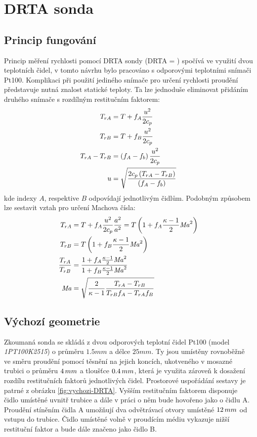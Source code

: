 \section{DRTA sonda}
    \subsection{Princip fungování} \label{sec:DRTA-princip}
        Princip měření rychlosti pomocí DRTA sondy (DRTA = ) spočívá ve využití dvou teplotních čidel, v tomto návrhu bylo pracováno s odporovými teplotními snímači Pt100. Komplikaci při použití jediného snímače pro určení rychlosti proudění představuje nutná znalost statické teploty. Ta lze jednoduše eliminovat přidáním druhého snímače s rozdílným restitučním faktorem:
        \begin{align}
            T_{rA} &= T + f_A \frac{u^2}{2 c_p} \\
            T_{rB} &= T + f_B \frac{u^2}{2 c_p} \\
            T_{rA} - T_{rB} &= \left( f_A - f_b \right) \frac{u^2}{2 c_p} \\
            u &= \sqrt{\frac{2 c_p \left( T_{rA} - T_{rB} \right)}{\left( f_A - f_b \right)}} \label{eq:mereni-rychlosti}             
        \end{align}
        \noindent kde indexy $A$, respektive $B$ odpovídají jednotlivým čidlům. Podobným způsobem lze sestavit vztah pro určení Machova čísla:
        \begin{align}
            T_{rA} &= T + f_A \frac{u^2}{2 c_p} \frac{a^2}{a^2} = T \left( 1 + f_A \frac{\kappa - 1}{2} \mathord{\mathit{Ma}} ^2 \right) \\
            T_{rB} &=  T \left( 1 + f_B \frac{\kappa - 1}{2} \mathord{\mathit{Ma}} ^2 \right) \\
            \frac{T_{rA}}{T_{rB}} &= \frac{1 + f_A \frac{\kappa - 1}{2} \mathord{\mathit{Ma}} ^2}{1 + f_B \frac{\kappa - 1}{2} \mathord{\mathit{Ma}} ^2} \\
            \mathord{\mathit{Ma}} &= \sqrt{\frac{2}{\kappa - 1} \frac{T_{rA}-T_{rB}}{T_{rB} f_A - T_{rA} f_B}}
        \end{align}

    \subsection{Výchozí geometrie}
        Zkoumaná sonda se skládá z dvou odporových teplotní čidel Pt100 (model \textit{1PT100K2515}) o průměru $1.5 \unit{mm}$ a délce $25 \unit{mm}$. Ty jsou umístěny rovnoběžně ve směru proudění pomocí těsnění na jejich koncích, ukotveného v mosazné trubici o průměru $4 \, mm$ a tloušťce $0.4 \, mm$, která je využita zároveň k dosažení rozdílu restitučních faktorů jednotlivých čidel. Prostorové uspořádání sestavy je patrné z obrázku \ref{fig:vychozi-DRTA}. Vyšším restitučním faktorem disponuje čidlo umístěné uvnitř trubice a dále v práci o něm bude hovořeno jako o čidlu A. Proudění stíněním čidla A umožňují dva odvětrávací otvory umístěné $12 \, mm$ od vstupu do trubice. Čidlo umístěné volně v proudícím médiu vykazuje nižší restituční faktor a bude dále značeno jako čidlo B.
        
